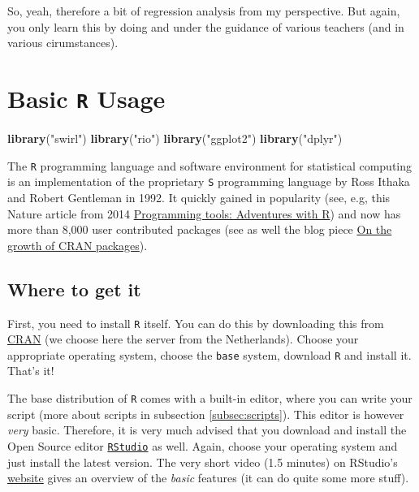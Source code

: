 \documentclass[]{article}
\newenvironment{Shaded}{\begin{snugshade}}{\end{snugshade}}
\newcommand{\KeywordTok}[1]{\textcolor[rgb]{0.13,0.29,0.53}{\textbf{{#1}}}}
\newcommand{\StringTok}[1]{\textcolor[rgb]{0.31,0.60,0.02}{{#1}}}
\newcommand{\NormalTok}[1]{{#1}}
\begin{document}
So, yeah, therefore a bit of regression analysis from my perspective.
But again, you only learn this by doing and under the guidance of
various teachers (and in various cirumstances).

\section{\texorpdfstring{Basic \texttt{R}
Usage}{Basic R Usage}}\label{basic-r-usage}

\begin{Shaded}
\begin{Highlighting}[]
\KeywordTok{library}\NormalTok{(}\StringTok{"swirl"}\NormalTok{)}
\KeywordTok{library}\NormalTok{(}\StringTok{"rio"}\NormalTok{)}
\KeywordTok{library}\NormalTok{(}\StringTok{"ggplot2"}\NormalTok{)}
\KeywordTok{library}\NormalTok{(}\StringTok{"dplyr"}\NormalTok{)}
\end{Highlighting}
\end{Shaded}

The \texttt{R} programming language and software environment for
statistical computing is an implementation of the proprietary \texttt{S}
programming language by Ross Ithaka and Robert Gentleman in 1992. It
quickly gained in popularity (see, e.g, this Nature article from 2014
\href{http://www.nature.com/news/programming-tools-adventures-with-r-1.16609}{Programming
tools: Adventures with R}) and now has more than 8,000 user contributed
packages (see as well the blog piece
\href{https://www.r-bloggers.com/on-the-growth-of-cran-packages/}{On the
growth of CRAN packages}).

\subsection{Where to get it}\label{where-to-get-it}

First, you need to install \texttt{R} itself. You can do this by
downloading this from \href{http://cran.xl-mirror.nl/}{CRAN} (we choose
here the server from the Netherlands). Choose your appropriate operating
system, choose the \texttt{base} system, download \texttt{R} and install
it. That's it!

The base distribution of \texttt{R} comes with a built-in editor, where
you can write your script (more about scripts in subsection
\ref{subsec:scripts}). This editor is however \emph{very} basic.
Therefore, it is very much advised that you download and install the
Open Source editor
\href{https://www.rstudio.com/products/rstudio/download/}{\texttt{RStudio}}
as well. Again, choose your operating system and just install the latest
version. The very short video (1.5 minutes) on RStudio's
\href{https://www.rstudio.com/products/rstudio/}{website} gives an
overview of the \emph{basic} features (it can do quite some more stuff).
\end{document}
